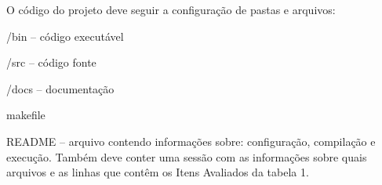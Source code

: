 O código do projeto deve seguir a configuração de pastas e arquivos\+:


\begin{DoxyItemize}
\item /bin – código executável
\item /src – código fonte
\item /docs – documentação
\item makefile
\item R\+E\+A\+D\+ME – arquivo contendo informações sobre\+: configuração, compilação e execução. Também deve conter uma sessão com as informações sobre quais arquivos e as linhas que contêm os Itens Avaliados da tabela 1. 
\end{DoxyItemize}
